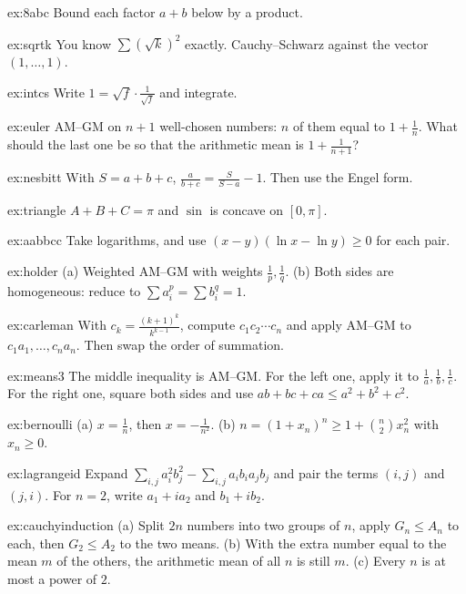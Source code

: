 \begin{hint}{ex:8abc}
Bound each factor $a+b$ below by a product.
\end{hint}
\begin{hint}{ex:sqrtk}
You know $\sum(\sqrt k)^2$ exactly. Cauchy--Schwarz against the vector $(1,\dots,1)$.
\end{hint}
\begin{hint}{ex:intcs}
Write $1=\sqrt f\cdot\frac1{\sqrt f}$ and integrate.
\end{hint}
\begin{hint}{ex:euler}
AM--GM on $n+1$ well-chosen numbers: $n$ of them equal to $1+\frac1n$. What should the last one be so that the arithmetic mean is $1+\frac1{n+1}$?
\end{hint}
\begin{hint}{ex:nesbitt}
With $S=a+b+c$, $\frac a{b+c}=\frac S{S-a}-1$. Then use the Engel form.
\end{hint}
\begin{hint}{ex:triangle}
$A+B+C=\pi$ and $\sin$ is concave on $[0,\pi]$.
\end{hint}
\begin{hint}{ex:aabbcc}
Take logarithms, and use $(x-y)(\ln x-\ln y)\ge0$ for each pair.
\end{hint}
\begin{hint}{ex:holder}
(a) Weighted AM--GM with weights $\frac1p,\frac1q$. (b) Both sides are homogeneous: reduce to $\sum a_i^p=\sum b_i^q=1$.
\end{hint}
\begin{hint}{ex:carleman}
With $c_k=\frac{(k+1)^k}{k^{k-1}}$, compute $c_1c_2\cdots c_n$ and apply AM--GM to $c_1a_1,\dots,c_na_n$. Then swap the order of summation.
\end{hint}
\begin{hint}{ex:means3}
The middle inequality is AM--GM. For the left one, apply it to $\frac1a,\frac1b,\frac1c$. For the right one, square both sides and use $ab+bc+ca\le a^2+b^2+c^2$.
\end{hint}
\begin{hint}{ex:bernoulli}
(a) $x=\frac1n$, then $x=-\frac1{n^2}$. (b) $n=(1+x_n)^n\ge1+\binom n2x_n^2$ with $x_n\ge0$.
\end{hint}
\begin{hint}{ex:lagrangeid}
Expand $\sum_{i,j}a_i^2b_j^2-\sum_{i,j}a_ib_ia_jb_j$ and pair the terms $(i,j)$ and $(j,i)$. For $n=2$, write $a_1+ia_2$ and $b_1+ib_2$.
\end{hint}
\begin{hint}{ex:cauchyinduction}
(a) Split $2n$ numbers into two groups of $n$, apply $G_n\le A_n$ to each, then $G_2\le A_2$ to the two means. (b) With the extra number equal to the mean $m$ of the others, the arithmetic mean of all $n$ is still $m$. (c) Every $n$ is at most a power of $2$.
\end{hint}
